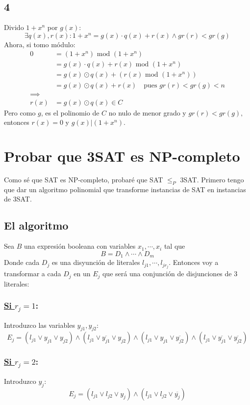 \documentclass[11pt]{article}
\begin{document}
\subsection*{4}
\label{sec:orgde5c8b0}
Divido \(1+x^n\) por \(g(x)\):
      \[ \exists q(x), r(x) : 1 + x^n = g(x) \cdot q(x) + r(x) \land gr(r) < gr(g) \]
Ahora, si tomo módulo:
\begin{align*}
	0 & = (1 + x^n) \text{ mod } (1 + x^n) \\
    & = g(x) \cdot q(x) + r(x) \text{ mod } (1 + x^n) \\
    & = g(x) \odot q(x) + (r(x) \text{ mod } (1 + x^n)) \\
    & = g(x) \odot q(x) + r(x) \quad\text{pues } gr(r) < gr(g) < n \\
\implies \\
r(x) & = g(x) \odot q(x) \in C
\end{align*}
Pero como \(g\), es el polinomio de \(C\) no nulo de menor grado y \({gr(r) < gr(g),}\) entonces \({r(x) = 0}\) y \({g(x) | (1 + x^n).}\)


\section{Probar que 3SAT es NP-completo}
\label{sec:org08f8785}
Como sé que SAT es NP-completo, probaré que SAT \(\le_P\) 3SAT. Primero tengo que dar un algoritmo polinomial que transforme instancias de SAT en instancias de 3SAT.

\subsection*{El algoritmo}
\label{sec:org204487f}
Sea \(B\) una expresión booleana con variables \({ x_1, \cdots, x_i }\) tal que
      \[ B = D_1 \land \cdots \land D_m \]
Donde cada \(D_j\) es una disyunción de literales \({l_{j1}, \cdots, l_{jr_j}.}\) Entonces voy a transformar a cada \(D_j\) en un \(E_j\) que será una conjunción de disjunciones de 3 literales:
\subsubsection*{\underline{Si \(r_j = 1\)}:}
\label{sec:org074bc0c}
Introduzco las variables \(y_{j1}, y_{j2}\):
    \[E_j = (l_{j1} \lor y_{j1} \lor y_{j2}) \land (l_{j1} \lor \overline{y_{j1}} \lor y_{j2}) \land (l_{j1} \lor y_{j1} \lor \overline{y_{j2}}) \land (l_{j1} \lor \overline{y_{j1}} \lor \overline{y_{j2}}) \]

\subsubsection*{\underline{Si \(r_j = 2\)}:}
\label{sec:org2bed3b5}
Introduzco \(y_j\):
      \[E_j = (l_{j1} \lor l_{j2} \lor y_j) \land (l_{j1} \lor l_{j2} \lor \overline{y_j}) \]
\end{document}
